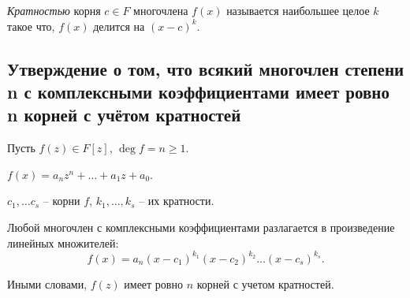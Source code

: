 \begin{definition}
    \textit{Кратностью} корня $c \in F$ многочлена $f(x)$ называется наибольшее целое $k$ такое что, $f(x)$ делится на $(x - c)^k$.
\end{definition}

\subsection{Утверждение о том, что всякий многочлен степени n с комплексными коэффициентами имеет ровно n корней с учётом кратностей}

\begin{corollary}
    Пусть $f(z) \in F[z]$, $\deg f = n \geq 1$.

    $f(x) = a_n z^n + \dots + a_1 z + a_0$.

    $c_1, \dots c_s$ -- корни $f$, $k_1, \dots, k_s$ -- их кратности.

    \bigskip
    Любой многочлен с комплексными коэффициентами разлагается в произведение линейных множителей:
    \begin{equation*}
        f(x) = a_n (x - c_1)^{k_1} (x - c_2)^{k_2} \dots (x - c_s)^{k_s}
    .\end{equation*}

    Иными словами, $f(z)$ имеет ровно $n$ корней с учетом кратностей.
\end{corollary}
